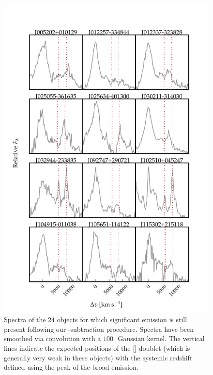 \begin{figure}
    \centering
    \includegraphics[width=\columnwidth]{figures/chapter04/example_spectrum_grid_extreme_fe_1.pdf} 
    \caption[{Spectra of the $24$ objects for which significant  emission is still present following our -subtraction procedure.}]{Spectra of the $24$ objects for which significant  emission is still present following our -subtraction procedure. Spectra have been smoothed via convolution with a $100$\,\kms\, Gaussian kernel. The vertical lines indicate the expected positions of the [] doublet (which is generally very weak in these objects) with the systemic redshift defined using the peak of the broad \hb emission.}     
    \label{fig:bad_fe}
\end{figure}

